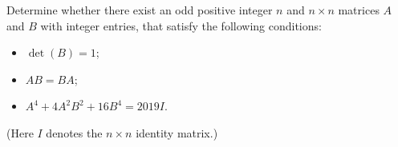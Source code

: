 Determine whether there exist an odd positive integer $n$ and $n\times n$ matrices $A$ and $B$ with integer entries, that satisfy the following conditions:
\begin{itemize}
	\item $\det (B)=1$;
	\item $AB=BA$;
	\item $A^4+4A^2B^2+16B^4=2019I$.
\end{itemize}
(Here $I$ denotes the $n\times n$ identity matrix.)

